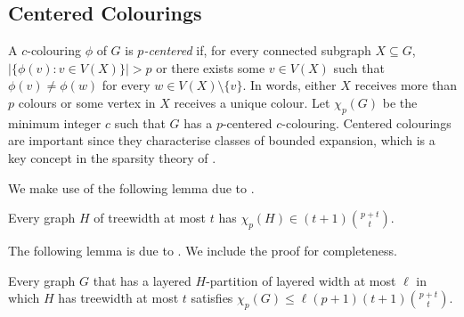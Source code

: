 \documentclass{patmorin}
\newcommand{\note}[2]{{\color{red}[#1:~#2]}}
\renewcommand{\le}{\leqslant}
\begin{document}
\subsection{Centered Colourings}

A $c$-colouring $\phi$ of $G$ is \emph{$p$-centered} if, for every connected subgraph $X\subseteq G$, $|\{\phi(v):v\in V(X)\}| > p$ or there exists some $v\in V(X)$ such that $\phi(v)\neq \phi(w)$ for every $w\in V(X)\setminus\{v\}$.  In words, either $X$ receives more than $p$ colours or some vertex in $X$ receives a unique colour.  Let $\chi_p(G)$ be the minimum integer $c$ such that $G$ has a $p$-centered $c$-colouring. 
Centered colourings are important since they characterise classes of bounded expansion, which is a key concept in the sparsity theory of \citet{Sparsity}. 

We make use of the following lemma due to \citet{pilipczuk.siebertz:polynomial-soda}.

\begin{lem}
\label{p-centered-treewidth}
Every graph $H$ of treewidth at most $t$ has $\chi_p(H)\in (t+1)\binom{p+t}{t}$.
\end{lem}

The following lemma is due to \citet{micek:personal}. We include the proof  for completeness. 

\begin{lem}
\label{p-centered}
Every graph $G$ that has a layered $H$-partition of layered width at most $\ell$ in which $H$ has treewidth at most $t$ satisfies $\chi_p(G)\le \ell (p+1) (t+1)\binom{p+t}{t}$. 
\end{lem}
\end{document}
